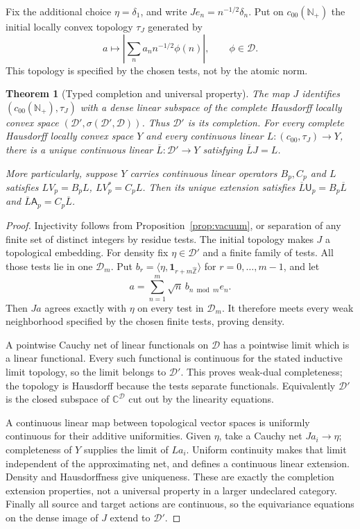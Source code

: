 \documentclass[11pt]{article}
\newtheorem{theorem}{Theorem}
\theoremstyle{remark}
\newcommand{\N}{\mathbb N}
\newcommand{\Zhat}{\widehat{\mathbb Z}}
\newcommand{\D}{\mathcal D}
\newcommand{\one}{\mathbf 1}
\begin{document}
Fix the additional choice $\eta=\delta_1$, and write
$Je_n=n^{-1/2}\delta_n$.  Put on $c_{00}(\N_+)$ the initial locally convex
topology $\tau_J$ generated by
\begin{equation}\label{eq:tau}
 a\longmapsto\left|\sum_n a_n n^{-1/2}\phi(n)\right|,
 \qquad \phi\in\D .
\end{equation}
This topology is specified by the chosen tests, not by the atomic norm.

\begin{theorem}[Typed completion and universal property]\label{thm:completion}
The map $J$ identifies $(c_{00}(\N_+),\tau_J)$ with a dense linear
subspace of the complete Hausdorff locally convex space
$(\D',\sigma(\D',\D))$.  Thus $\D'$ is its completion.
For every complete Hausdorff locally convex space $Y$ and every continuous
linear $L:(c_{00},\tau_J)\to Y$, there is a unique continuous linear
$\overline L:\D'\to Y$ satisfying $\overline L J=L$.

More particularly, suppose $Y$ carries continuous linear operators
$B_p,C_p$ and $L$ satisfies $LV_p=B_pL$, $LV_p^*=C_pL$.
Then its unique extension satisfies
$\overline L\mathsf U_p=B_p\overline L$ and
$\overline L\mathsf A_p=C_p\overline L$.
\end{theorem}
\begin{proof}
Injectivity follows from Proposition~\ref{prop:vacuum}, or separation
of any finite set of distinct integers by residue tests.  The initial
topology makes $J$ a topological embedding.
For density fix $\eta\in\D'$ and a finite family of tests.  All those
tests lie in one $\D_m$.  Put
$b_r=\langle\eta,\one_{r+m\Zhat}\rangle$ for $r=0,\ldots,m-1$, and let
\[
 a=\sum_{n=1}^m\sqrt n\,b_{n\bmod m}e_n.
\]
Then $Ja$ agrees exactly with $\eta$ on every test in $\D_m$.
It therefore meets every weak neighborhood specified by the chosen
finite tests, proving density.

A pointwise Cauchy net of linear functionals on $\D$ has a pointwise
limit which is a linear functional.  Every such functional is continuous
for the stated inductive limit topology, so the limit belongs to $\D'$.
This proves weak-dual completeness; the topology is Hausdorff because
the tests separate functionals.  Equivalently $\D'$ is the closed
subspace of $\mathbb C^{\D}$ cut out by the linearity equations.

A continuous linear map between topological vector spaces is uniformly
continuous for their additive uniformities.  Given $\eta$, take a
Cauchy net $Ja_i\to\eta$; completeness of $Y$ supplies the limit of
$La_i$.  Uniform continuity makes that limit independent of the
approximating net, and defines a continuous linear extension.  Density
and Hausdorffness give uniqueness.  These are exactly the completion
extension properties, not a universal property in a larger undeclared
category.  Finally all source and target actions are continuous, so
the equivariance equations on the dense image of $J$ extend to $\D'$.
\end{proof}
\end{document}
